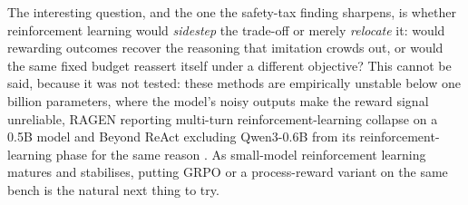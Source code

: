 The interesting question, and the one the safety-tax finding sharpens, is whether reinforcement learning would \emph{sidestep} the trade-off or merely \emph{relocate} it: would rewarding outcomes recover the reasoning that imitation crowds out, or would the same fixed budget reassert itself under a different objective? This cannot be said, because it was not tested: these methods are empirically unstable below one billion parameters, where the model's noisy outputs make the reward signal unreliable, RAGEN reporting multi-turn reinforcement-learning collapse on a 0.5B model \cite{wang2025ragenunderstandingselfevolutionllm} and Beyond ReAct excluding Qwen3-0.6B from its reinforcement-learning phase for the same reason \cite{wei2025reactplannercentricframeworkcomplex}. As small-model reinforcement learning matures and stabilises, putting GRPO or a process-reward variant on the same bench is the natural next thing to try.

